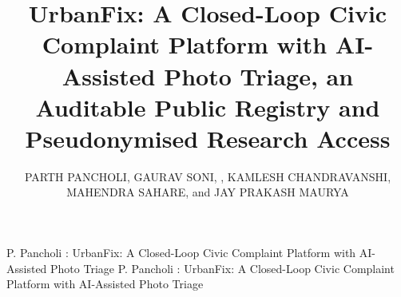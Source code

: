 \documentclass{ieeeaccess}
\begin{document}

\title{UrbanFix: A Closed-Loop Civic Complaint Platform with AI-Assisted Photo Triage, an Auditable Public Registry and Pseudonymised Research Access}

\author{\uppercase{Parth Pancholi},
\uppercase{Gaurav Soni}, ,
\uppercase{Kamlesh Chandravanshi},
\uppercase{Mahendra Sahare}, and
\uppercase{Jay Prakash Maurya}}

\address[1]{School of Computing Science and Engineering, VIT Bhopal University, Bhopal, India (e-mail: parth.25bce10443@vitbhopal.ac.in; gaurav.soni@vitbhopal.ac.in; kamlesh.chandravanshi@vitbhopal.ac.in; jpeemaurya@gmail.com)}
\address[2]{School of Computer Science and Engineering, VIT-AP University, Amaravati, India (e-mail: mahendra.sahare@vitap.ac.in)}

\markboth
{P. Pancholi \headeretal: UrbanFix: A Closed-Loop Civic Complaint Platform with AI-Assisted Photo Triage}
{P. Pancholi \headeretal: UrbanFix: A Closed-Loop Civic Complaint Platform with AI-Assisted Photo Triage}

\end{document}
